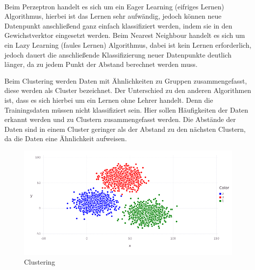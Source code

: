 \\
\newline
Beim Perzeptron handelt es sich um ein Eager Learning (eifriges Lernen) Algorithmus, hierbei ist das Lernen sehr aufwändig, jedoch können neue Datenpunkt anschließend ganz einfach klassifiziert werden, indem sie in den Gewichstverktor eingesetzt werden. Beim Nearest Neighbour handelt es sich um ein Lazy Learning (faules Lernen) Algorithmus, dabei ist kein Lernen erforderlich, jedoch dauert die anschließende Klassifizierung neuer Datenpunkte deutlich länger, da zu jedem Punkt der Abstand berechnet werden muss.

\newpage
{}
Beim Clustering werden Daten mit Ähnlichkeiten zu Gruppen zusammengefasst, diese werden als Cluster bezeichnet. Der Unterschied zu den anderen Algorithmen ist, dass es sich hierbei um ein Lernen ohne Lehrer handelt. Denn die Trainingsdaten müssen nicht klassifiziert sein. Hier sollen Häufigkeiten der Daten erkannt werden und zu Clustern zusammengefasst werden. Die Abstände der Daten sind in einem Cluster geringer als der Abstand zu den nächsten Clustern, da die Daten eine Ähnlichkeit aufweisen.
 \begin{figure}[h]
	\includegraphics[width=1\linewidth]{Bilder/clustering}
	\caption{Clustering}\label{clustering}
\end{figure}  

